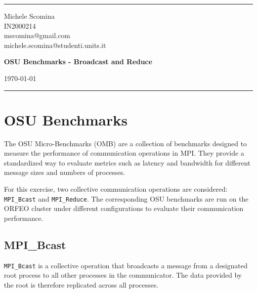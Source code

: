 \documentclass[a4paper]{article}
\begin{document}
\fancyhead[C]{}
\hrule \medskip
\begin{minipage}{0.295\textwidth} 
  \raggedright
  \scriptsize
  Michele Scomina \hfill\\   
  IN2000214\hfill\\
  mscomina@gmail.com\hfill\\
  michele.scomina@studenti.units.it
\end{minipage}
\begin{minipage}{0.4\textwidth} 
\centering 
\large 
\textbf{OSU Benchmarks - Broadcast and Reduce}\\ 
\end{minipage}
\begin{minipage}{0.295\textwidth} 
\raggedleft
\today\hfill\\
\end{minipage}
\medskip\hrule 
\bigskip

\setlength{\parskip}{4pt}

\begin{abstract}
This is the report for Exercise 1. In this report we showcase the steps taken to compile the OSU Benchmark and run said benchmarks on two collective operations on the ORFEO cluster, as described in the \href{https://github.com/Foundations-of-HPC/High-Performance-Computing-2023/blob/main/ASSIGNMENTS/exercise1/exercise1.md}{GitHub repository}.
\end{abstract}

\section{OSU Benchmarks}

The OSU Micro-Benchmarks (OMB) are a collection of benchmarks designed to measure the performance of communication operations in MPI. They provide a standardized way to evaluate metrics such as latency and bandwidth for different message sizes and numbers of processes.

For this exercise, two collective communication operations are considered: \texttt{MPI\_Bcast} and \texttt{MPI\_Reduce}. The corresponding OSU benchmarks are run on the ORFEO cluster under different configurations to evaluate their communication performance.

\subsection{MPI\_Bcast}

\texttt{MPI\_Bcast} is a collective operation that broadcasts a message from a designated root process to all other processes in the communicator. The data provided by the root is therefore replicated across all processes.
\end{document}
